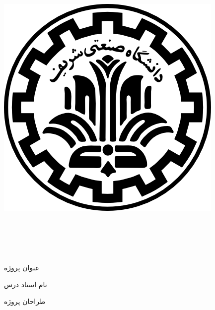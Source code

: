 
\begin{center}

\includegraphics[scale=0.2]{front/template/images/logo.png}

\vspace{-0.2cm}
\University \\[-0.3em]
\Department\\


\begin{large}
\vspace{0.5cm}



\end{large}

\vspace{1.5cm}

{\LARGE\textbf{\CourseReportTitle}}\\ 
\vspace{1cm}
\begin{latin}
{\Large\textbf\EnglishCourseTitle}
\end{latin}


{عنوان پروژه}\\[.5em]
{\large\textbf{\CourseName}}

\vspace{0.4cm}

{نام استاد درس}\\[.5em]
{\large\textbf{\CourseProfessor}}

\vspace{1.5cm}

{طراحان پروژه}\\[.5em]
{\large\textbf{\GroupeMembers}}

\vspace{0.7cm}

{\large\textbf{\courseSemester}}

\vspace{1.2cm}

\end{center}

\newpage
